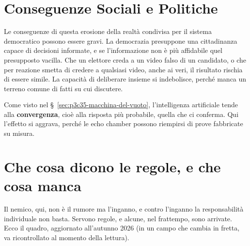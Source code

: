 
\section{Conseguenze Sociali e Politiche}

Le conseguenze di questa erosione della realtà condivisa per il sistema democratico possono essere gravi. La democrazia presuppone una cittadinanza capace di decisioni informate, e se l'informazione non è più affidabile quel presupposto vacilla. Che un elettore creda a un video falso di un candidato, o che per reazione smetta di credere a qualsiasi video, anche ai veri, il risultato rischia di essere simile. La capacità di deliberare insieme si indebolisce, perché manca un terreno comune di fatti su cui discutere.

Come visto nel \S~\ref{sec:p3c35-macchina-del-vuoto}, l'intelligenza artificiale tende alla \textbf{convergenza}, cioè alla risposta più probabile, quella che ci conferma. Qui l'effetto si aggrava, perché le echo chamber possono riempirsi di prove fabbricate su misura.

\section{Che cosa dicono le regole, e che cosa manca}

Il nemico, qui, non è il rumore ma l'inganno, e contro l'inganno la responsabilità individuale non basta. Servono regole, e alcune, nel frattempo, sono arrivate. Ecco il quadro, aggiornato all'autunno 2026 (in un campo che cambia in fretta, va ricontrollato al momento della lettura).

